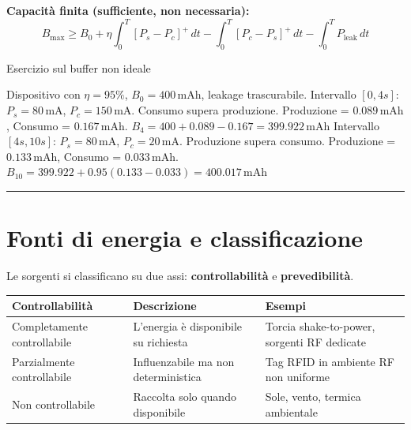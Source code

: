\documentclass[
  italian,
  openany]{book}
\newcounter{none} %
\begin{document}
\textbf{Capacità finita (sufficiente, non necessaria):}
\[B_{\mathrm{max}} \geq B_0 + \eta\int_0^T [P_s - P_c]^+\,dt - \int_0^T [P_c - P_s]^+\,dt - \int_0^T P_{\mathrm{leak}}\,dt\]

\begin{callouttip}{Esercizio sul buffer non ideale}

Dispositivo con \(\eta = 95\%\), \(B_0 = 400\,\mathrm{mAh}\), leakage
trascurabile. Intervallo \([0, 4s]\): \(P_s = 80\,\mathrm{mA}\),
\(P_c = 150\,\mathrm{mA}\). Consumo supera produzione. Produzione =
\(0.089\,\mathrm{mAh}\), Consumo = \(0.167\,\mathrm{mAh}\).
\(B_4 = 400 + 0.089 - 0.167 = 399.922\,\mathrm{mAh}\) Intervallo
\([4s, 10s]\): \(P_s = 80\,\mathrm{mA}\), \(P_c = 20\,\mathrm{mA}\).
Produzione supera consumo. Produzione = \(0.133\,\mathrm{mAh}\), Consumo
= \(0.033\,\mathrm{mAh}\).
\(B_{10} = 399.922 + 0.95(0.133 - 0.033) = 400.017\,\mathrm{mAh}\)

\end{callouttip}

\begin{center}\rule{0.5\linewidth}{0.5pt}\end{center}

\section{Fonti di energia e
classificazione}\label{fonti-di-energia-e-classificazione}

Le sorgenti si classificano su due assi: \textbf{controllabilità} e
\textbf{prevedibilità}.

{\def\LTcaptype{none} %
\begin{longtable}[]{@{}
  >{\raggedright\arraybackslash}p{}
  >{\raggedright\arraybackslash}p{}
  >{\raggedright\arraybackslash}p{}@{}}
\toprule\noalign{}
\begin{minipage}[b]{\linewidth}\raggedright
Controllabilità
\end{minipage} & \begin{minipage}[b]{\linewidth}\raggedright
Descrizione
\end{minipage} & \begin{minipage}[b]{\linewidth}\raggedright
Esempi
\end{minipage} \\
\midrule\noalign{}
\endhead
\bottomrule\noalign{}
\endlastfoot
Completamente controllabile & L'energia è disponibile su richiesta &
Torcia shake-to-power, sorgenti RF dedicate \\
Parzialmente controllabile & Influenzabile ma non deterministica & Tag
RFID in ambiente RF non uniforme \\
Non controllabile & Raccolta solo quando disponibile & Sole, vento,
termica ambientale \\
\end{longtable}
}
\end{document}
